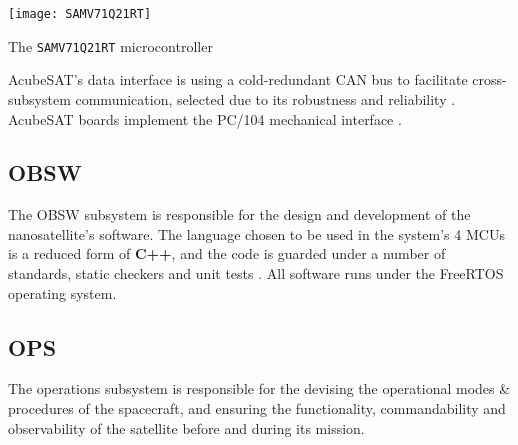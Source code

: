 \documentclass[a4paper,nobib]{tufte-book}
\begin{document}
\begin{marginfigure}
	\centering
	\texttt{[image: SAMV71Q21RT]}
	\caption{The \texttt{SAMV71Q21RT} microcontroller}
	\label{fig:samv71}
\end{marginfigure}

AcubeSAT's data interface is using a cold-redundant \ac{CAN} bus to facilitate cross-subsystem communication, selected due to its robustness and reliability \autocite{bouwmeester_survey_implementation_2017}. AcubeSAT boards implement the PC/104 mechanical interface \autocite{PC104}.

\subsection{\acf{OBSW}}

The \ac{OBSW} subsystem is responsible for the design and development of the nanosatellite's software. The language chosen to be used in the system's 4 \acp{MCU} is a reduced form of \textbf{C++}, and the code is guarded under a number of standards, static checkers and unit tests \autocite{DDJF_OBSW}. All software runs under the Free\acs{RTOS} operating system.



\subsection{\acf{OPS}}

The operations subsystem is responsible for the devising the operational modes \& procedures of the spacecraft, and ensuring the functionality, commandability and observability of the satellite before and during its mission.
\end{document}
